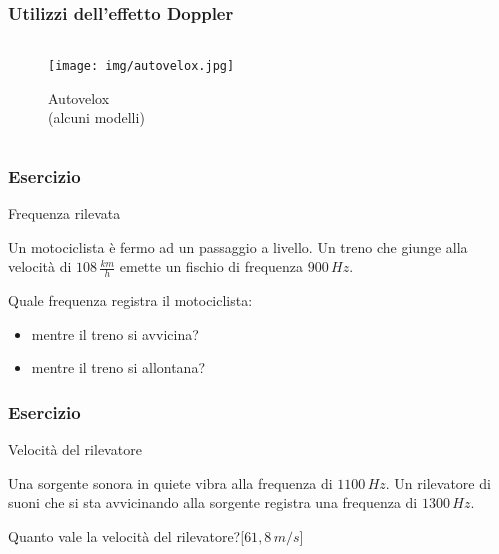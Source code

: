 \documentclass[]{beamer}
\theoremstyle{plain}
\begin{document}


\begin{frame}
  \frametitle{Utilizzi dell'effetto Doppler}
  \begin{columns}
    \begin{column}{0.3\textwidth}
      \begin{figure}
        \texttt{[image: img/autovelox.jpg]}
        
        Autovelox\\(alcuni modelli)
      \end{figure}
    \end{column}
    \begin{column}{0.3\textwidth}
    \end{column}
    \begin{column}{0.3\textwidth}
    \end{column}
  \end{columns}
\end{frame}


\begin{frame}
\frametitle{Esercizio}
\begin{exampleblock}{Frequenza rilevata}
\small{Un motociclista è fermo ad un passaggio a livello. Un treno che giunge alla velocità di $ 108 \, \frac{km}{h} $ emette un fischio di frequenza $ 900 \, Hz $.

Quale frequenza registra il motociclista:
\begin{itemize}
  \item mentre il treno si avvicina?
  \item mentre il treno si allontana?
\end{itemize}}
\end{exampleblock}
\end{frame}


\begin{frame}
\frametitle{Esercizio}
\begin{exampleblock}{Velocità del rilevatore}
\small{Una sorgente sonora in quiete vibra alla frequenza di $ 1100\, Hz $. Un rilevatore di suoni che si sta avvicinando alla sorgente registra una frequenza di $ 1300 \, Hz $. 

Quanto vale la velocità del rilevatore?\hspace*{\fill}[$ 61,8 \, m/s $]}
\end{exampleblock}
\end{frame}
\end{document}
